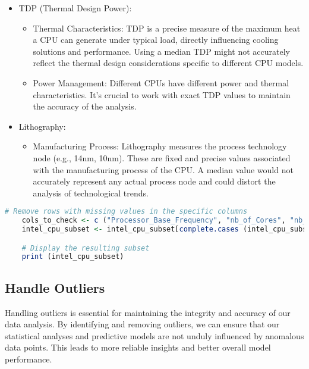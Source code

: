 \begin{itemize}
    \item TDP (Thermal Design Power):
    \begin{itemize}
        \item Thermal Characteristics: TDP is a precise measure of the maximum heat a CPU can generate under typical load, directly influencing cooling solutions and performance. Using a median TDP might not accurately reflect the thermal design considerations specific to different CPU models.
        \item Power Management: Different CPUs have different power and thermal characteristics. It's crucial to work with exact TDP values to maintain the accuracy of the analysis.
    \end{itemize}

    \item Lithography:
    \begin{itemize}
        \item Manufacturing Process: Lithography measures the process technology node (e.g., 14nm, 10nm). These are fixed and precise values associated with the manufacturing process of the CPU. A median value would not accurately represent any actual process node and could distort the analysis of technological trends.
    \end{itemize}
\end{itemize}

\begin{lstlisting}[language=R]
    # Remove rows with missing values in the specific columns
    cols_to_check <- c ("Processor_Base_Frequency", "nb_of_Cores", "nb_of_Threads", "TDP", "Lithography")
    intel_cpu_subset <- intel_cpu_subset[complete.cases (intel_cpu_subset[, cols_to_check]), ]

    # Display the resulting subset
    print (intel_cpu_subset)
\end{lstlisting}

\subsection{Handle Outliers}
Handling outliers is essential for maintaining the integrity and accuracy of our data analysis. By identifying and removing outliers, we can ensure that our statistical analyses and predictive models are not unduly influenced by anomalous data points. This leads to more reliable insights and better overall model performance.

